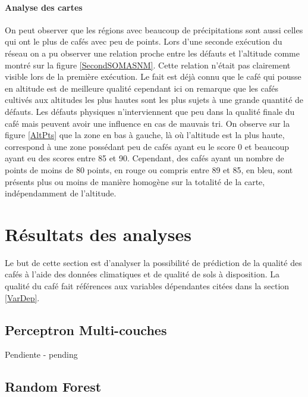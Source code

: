 \newpage
\paragraph{Analyse des cartes}On peut observer que les régions avec beaucoup de précipitations sont aussi celles qui ont le plus de cafés avec peu de points. Lors d'une seconde exécution du réseau on a pu observer une relation proche entre les défauts et l'altitude comme montré sur la figure \ref{SecondSOMASNM}. Cette relation n'était pas clairement visible lors de la première exécution. Le fait est déjà connu que le café qui pousse en altitude est de meilleure qualité cependant ici on remarque que les cafés cultivés aux altitudes les plus hautes sont les plus sujets à une grande quantité de défauts. Les défauts physiques n'interviennent que peu dans la qualité finale du café mais peuvent avoir une influence en cas de mauvais tri. On observe sur la figure \ref{AltPts} que la zone en bas à gauche, là où l'altitude est la plus haute, correspond à une zone possédant peu de cafés ayant eu le score 0 et beaucoup ayant eu des scores entre 85 et 90. Cependant, des cafés ayant un nombre de points de moins de 80 points, en rouge ou compris entre 89 et 85, en bleu, sont présents plus ou moins de manière homogène sur la totalité de la carte, indépendamment de l'altitude.  









\newpage

\section{Résultats des analyses  }
Le but de cette section est d'analyser la possibilité de prédiction de la qualité des cafés à l'aide des données climatiques et de qualité de sols à disposition. La qualité du café fait références aux variables dépendantes citées dans la section \ref{VarDep}.

\subsection{Perceptron Multi-couches}
Pendiente - pending


\subsection{Random Forest}
